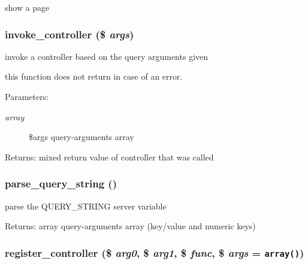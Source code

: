 show a page \hypertarget{controller_8inc_8php_170bef82dc4636c51b678276323e4ff4}{
\subsubsection[{invoke\_\-controller}]{\setlength{\rightskip}{0pt plus 5cm}invoke\_\-controller (\$ {\em args})}}
\label{controller_8inc_8php_170bef82dc4636c51b678276323e4ff4}


invoke a controller based on the query arguments given

this function does not return in case of an error. \begin{Desc}
\item[Parameters:]
\begin{description}
\item[{\em array}]\$args query-arguments array \end{description}
\end{Desc}
\begin{Desc}
\item[Returns:]mixed return value of controller that was called \end{Desc}
\hypertarget{controller_8inc_8php_51a50fbc5165b4ff0a289b2010bb7597}{
\subsubsection[{parse\_\-query\_\-string}]{\setlength{\rightskip}{0pt plus 5cm}parse\_\-query\_\-string ()}}
\label{controller_8inc_8php_51a50fbc5165b4ff0a289b2010bb7597}


parse the QUERY\_\-STRING server variable

\begin{Desc}
\item[Returns:]array query-arguments array (key/value and numeric keys) \end{Desc}
\hypertarget{controller_8inc_8php_543961dbcd309fa2cb6a887a8666bf1c}{
\subsubsection[{register\_\-controller}]{\setlength{\rightskip}{0pt plus 5cm}register\_\-controller (\$ {\em arg0}, \/  \$ {\em arg1}, \/  \$ {\em func}, \/  \$ {\em args} = {\tt array()})}}
\label{controller_8inc_8php_543961dbcd309fa2cb6a887a8666bf1c}


